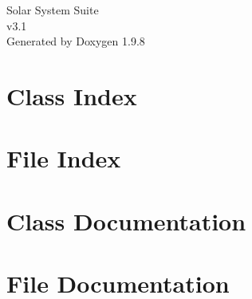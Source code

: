 \documentclass[twoside]{book}
\newcommand{\+}{\discretionary{\mbox{\scriptsize$\hookleftarrow$}}{}{}}
\newcommand{\clearemptydoublepage}{%
    \newpage{\pagestyle{empty}\cleardoublepage}%
  }
\begin{document}
  \raggedbottom
    \hypersetup{pageanchor=false,
                bookmarksnumbered=true,
                pdfencoding=unicode
               }
  \begin{titlepage}
  \vspace*{7cm}
  \begin{center}%
  {\Large Solar System Suite}\\
  [1ex]\large v3.\+1 \\
  \vspace*{1cm}
  {\large Generated by Doxygen 1.9.8}\\
  \end{center}
  \end{titlepage}
  \clearemptydoublepage
  \tableofcontents
  \clearemptydoublepage
  \hypersetup{pageanchor=true}

\chapter{Class Index}

\chapter{File Index}

\chapter{Class Documentation}















\chapter{File Documentation}


























  \backmatter
  \newpage
  \clearemptydoublepage
  \printindex
\end{document}

